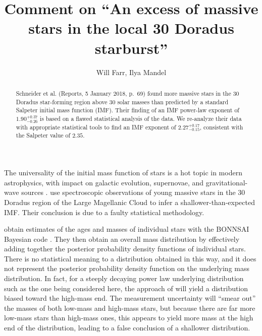 \documentclass[apjl]{emulateapj}
\newcommand{\onesigrange}[3]{\ensuremath{#1^{+#2}_{-#3}}}
\newcommand{\alpharange}{\onesigrange{2.27}{0.17}{0.15}}
\begin{document}
\title{Comment on ``An excess of massive stars in the local 30 Doradus starburst''}

\author{Will Farr, Ilya Mandel}

\begin{abstract}
Schneider et al. (Reports, 5 January 2018, p.~69) found more massive stars in the 30 Doradus star-forming region above 30 solar masses than predicted by a standard Salpeter initial mass function (IMF).  Their finding of an IMF power-law exponent of $1.90^{+0.37}_{-0.26}$ is based on a flawed statistical analysis of the data.  We re-analyze their data with appropriate statistical tools to find an IMF exponent of $\alpharange$, consistent with the Salpeter value of $2.35$.
\end{abstract}

\maketitle

The universality of the initial mass function of stars is a hot topic in modern astrophysics, with impact on galactic evolution, supernovae, and gravitational-wave sources \cite{Kroupa:review,Bastian:2010}.    \citet{Schneider:2018} use spectroscopic observations of young massive stars in the 30 Doradus region of the Large Magellanic Cloud to infer a shallower-than-expected IMF.  Their conclusion is due to a faulty statistical methodology.  

\citet{Schneider:2018} obtain estimates of the ages and masses of individual stars with the BONNSAI Bayesian code \cite{Schneider:Bonn}.  They then obtain an overall mass distribution by effectively adding together the posterior probability density functions of individual stars.  There is no statistical meaning to a distribution obtained in this way, and it does not represent the posterior probability density function on the underlying mass distribution.  In fact, for a steeply decaying power law underlying distribution such as the one being considered here, the approach of \cite{Schneider:2018} will yield a distribution biased toward the high-mass end.  The measurement uncertainty will ``smear out'' the masses of both low-mass and high-mass stars, but because there are far more low-mass stars than high-mass ones, this appears to yield more mass at the high end of the distribution, leading to a false conclusion of a shallower distribution.
\end{document}
